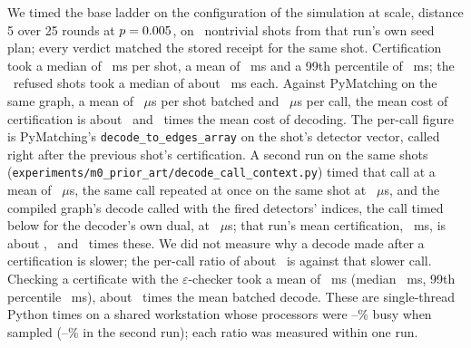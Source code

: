 \documentclass[aps,pra,twocolumn,superscriptaddress,nofootinbib,longbibliography,floatfix]{revtex4-2}
\newcommand{\eps}{\varepsilon}
\begin{document}
We timed the base ladder on the configuration of the simulation at scale, distance 5 over 25 rounds at $p=0.005$, on \CostShots\ nontrivial shots from that run's own seed plan; every verdict matched the stored receipt for the same shot. Certification took a median of \CertifyMsMedian~ms per shot, a mean of \CertifyMsMean~ms and a 99th percentile of \CertifyMsPNinetyNine~ms; the \CertifyRefusedN\ refused shots took a median of about \CertifyRefusedMsMedian~ms each. Against PyMatching on the same graph, a mean of \DecodeUsBatch~$\mu$s per shot batched and \DecodeUsPerShot~$\mu$s per call, the mean cost of certification is about \CostRatioBatch\ and \CostRatioPerShot\ times the mean cost of decoding. The per-call figure is PyMatching's \texttt{decode\_to\_edges\_array} on the shot's detector vector, called right after the previous shot's certification. A second run on the same shots (\nolinkurl{experiments/m0_prior_art/decode_call_context.py}) timed that call at a mean of \DecodeCtxAfterUsMean~$\mu$s, the same call repeated at once on the same shot at \DecodeCtxRepeatedUsMean~$\mu$s, and the compiled graph's decode called with the fired detectors' indices, the call timed below for the decoder's own dual, at \DecodeCtxBindingUsMean~$\mu$s; that run's mean certification, \DecodeCtxCertifyMsMean~ms, is about \DecodeCtxAfterRatio, \DecodeCtxRepeatedRatio\ and \DecodeCtxBindingRatio\ times these. We did not measure why a decode made after a certification is slower; the per-call ratio of about \CostRatioPerShot\ is against that slower call. Checking a certificate with the $\eps$-checker took a mean of \CheckMsMean~ms (median \CheckMsMedian~ms, 99th percentile \CheckMsPNinetyNine~ms), about \CostRatioCheckBatch\ times the mean batched decode. These are single-thread Python times on a shared workstation whose processors were \CostCpuLoadPct--\CostCpuLoadAfterPct\% busy when sampled (\DecodeCtxCpuLo--\DecodeCtxCpuHi\% in the second run); each ratio was measured within one run.
\end{document}
